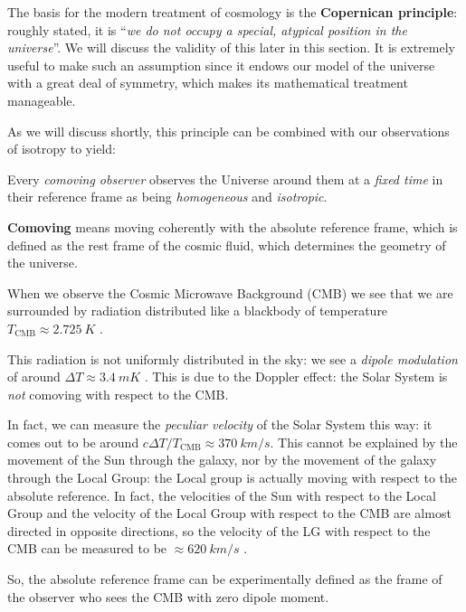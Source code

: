 \documentclass[main.tex]{subfiles}
\begin{document}
The basis for the modern treatment of cosmology is the \textbf{Copernican principle}:
roughly stated, it is ``\emph{we do not occupy a special, atypical position in the universe}''.
We will discuss the validity of this later in this section.
It is extremely useful to make such an assumption since it endows our model of the universe with a great deal of symmetry, which makes its mathematical treatment manageable. 

As we will discuss shortly, this principle can be combined with our observations of isotropy to yield:
%
\begin{proposition}
    Every \emph{comoving observer} observes the Universe around them at a \emph{fixed time} in their reference frame as being \emph{homogeneous} and \emph{isotropic}.
\end{proposition}

\textbf{Comoving} means moving coherently with the absolute reference frame, which is defined as the rest frame of the cosmic fluid, which determines the geometry of the universe. 

When we observe the Cosmic Microwave Background (CMB) we see that we are surrounded by radiation distributed like a blackbody of temperature \(T _{\text{CMB}} \approx \SI{2.725}{K}\) \cite[]{fixsenTEMPERATURECOSMICMICROWAVE2009}.

This radiation is not uniformly distributed in the sky: we 
see a \emph{dipole modulation} of around \(\Delta T \approx\SI{3.4}{mK}\) \cite[]{planckcollaborationPlanck2018Results2019a}.
This is due to the Doppler effect: the Solar System is \emph{not} comoving with respect to the CMB.

In fact, we can measure the \emph{peculiar velocity} of the Solar System this way: it comes out to be around \(c \Delta T / T _{\text{CMB}} \approx \SI{370}{km/s}\).
This cannot be explained by the movement of the Sun through the galaxy, nor by the movement of the galaxy through the Local Group: the Local group is actually moving with respect to the absolute reference.
In fact, the velocities of the Sun with respect to the Local Group and the velocity of the Local Group with respect to the CMB are almost directed in opposite directions, so the velocity of the LG with respect to the CMB can be measured to be \(\approx \SI{620}{km/s}\) \cite[Table 3]{planckcollaborationPlanck2018Results2019a}.

So, the absolute reference frame can be experimentally defined as the frame of the observer who sees the CMB with zero dipole moment.
\end{document}
